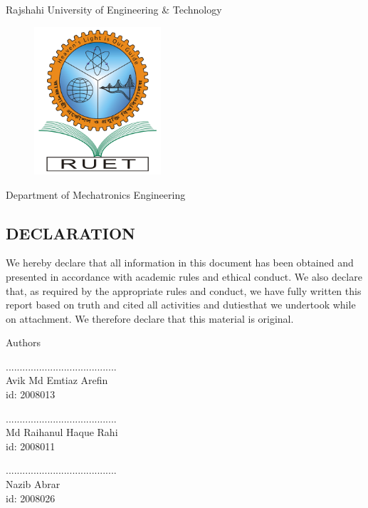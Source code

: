 \begin{center}
    Rajshahi University of Engineering \& Technology
\end{center}
\begin{figure}[h!]
    \centering
    \includegraphics[width=4.7cm]{figs/RUET.png}
\end{figure}
\begin{center}
    Department of Mechatronics Engineering
    \subsection*{DECLARATION}
\end{center}

\noindent We hereby declare that all information in this document has been obtained and presented in accordance with academic rules and ethical conduct. We also declare that, as required by the appropriate rules and conduct, we have fully written this report based on truth and cited all activities and dutiesthat we undertook while on attachment. We therefore declare that this material is original.

\singlespacing
\begin{center}

Authors

\vspace{0.5cm}

........................................ \\
Avik Md Emtiaz Arefin \\
id: 2008013

\vspace{0.5cm}

........................................ \\
Md Raihanul Haque Rahi \\
id: 2008011

\vspace{0.5cm}

........................................ \\
Nazib Abrar \\
id: 2008026
\end{center}
\doublespacing